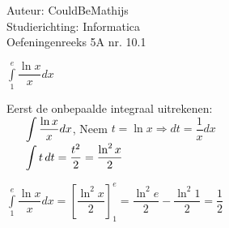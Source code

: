 \documentclass[a4paper]{article}
\newcommand{\bepint}{\displaystyle\int\limits}
\newcommand{\onbint}{\displaystyle\int}
\begin{document}
  
\noindent \large Auteur: CouldBeMathijs \\
\noindent \large Studierichting: Informatica\\
\noindent \large Oefeningenreeks 5A nr. 10.1\\

\medskip

\normalsize

$\bepint_1^e \dfrac{\ln x}{x} dx$\\

\medskip

Eerst de onbepaalde integraal uitrekenen:\\

$\indent \onbint \dfrac{\ln x}{x} dx$, Neem $t = \ln x \Rightarrow dt = \dfrac{1}{x} dx$\\

$\indent \onbint t \, dt = \dfrac{t^2}{2} = \dfrac{\ln^2 x}{2}$\\

\medskip

$\bepint_1^e \dfrac{\ln x}{x} dx = \left[\dfrac{\ln^2 x}{2}\right]^e_1 = \dfrac{\ln^2 e}{2} - \dfrac{\ln^2 1}{2} = \dfrac{1}{2}$


\begin{thebibliography}{999}
\end{thebibliography}
\end{document}

